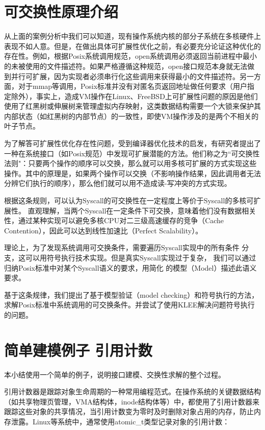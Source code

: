 \section{可交换性原理介绍}

从上面的案例分析中我们可以知道，现有操作系统内核的部分子系统在多核硬件上表现不如人意。但是，在做出具体可扩展性优化之前，有必要充分论证这种优化的存在性。例如，根据Posix系统调用规范，open系统调用必须返回当前进程中最小的未被使用的文件描述符。如果严格遵循这种规范，open接口规范本身就无法做到并行可扩展，因为实现者必须串行化这些调用来获得最小的文件描述符。另一方面，对于mmap等调用，Posix标准并没有对匿名页返回地址做任何要求（用户指定除外），事实上，造成VM操作在Linux、FreeBSD上可扩展性问题的原因是他们使用了红黑树或伸展树来管理虚拟内存映射\cite{radixvm:eurosys13}，这类数据结构需要一个大锁来保护其内部状态（如红黑树的内部节点）的一致性，即使VM操作涉及的是两个不相关的叶子节点。

为了解答可扩展性优化存在性问题，受到编译器优化技术的启发，有研究者提出了一种在系统接口（如Posix规范）中发现可扩展潜能的方法\cite{commuter:2013}。他们称之为``可交换性法则"：只要两个操作的顺序可以交换，那么就可以用多核可扩展的方式实现这些操作。其中的原理是，如果两个操作可以交换（不影响操作结果，因此调用者无法分辨它们执行的顺序），那么他们就可以用不造成读-写冲突的方式实现。

根据这条规则，可以认为Syscall的可交换性在一定程度上等价于Syscall的多核可扩展性。
直观理解，当两个Syscall在一定条件下可交换，意味着他们没有数据相关性，通过某种实现可以避免多核CPU对二三级高速缓存的竞争（Cache
Contention），因此可以达到线性加速比（Perfect Scalability）。

理论上，为了发现系统调用可交换条件，需要遍历Syscall实现中的所有条件
分支，这可以用符号执行技术实现。但是真实Syscall实现过于复杂，
我们可以通过归纳Posix标准中对某个Syscall语义的要求，用简化
的模型（Model）描述此语义要求。

基于这条规律，我们提出了基于模型验证（model
checking）和符号执行的方法，求解Posix标准中系统调用的可交换条件。并尝试了使用KLEE\cite{Cadar:2008:KUA:1855741.1855756}解决问题符号执行的问题。

\section{简单建模例子 \pozhehao 引用计数}
\label{sec:counter}
本小结使用一个简单的例子，说明接口建模、交换性求解的整个过程。

引用计数器是跟踪对象生命周期的一种常用编程范式。在操作系统的关键数据结构（如共享物理页管理，VMA结构体，inode结构体等）中，都使用了引用计数器来跟踪这些对象的共享情况，当引用计数变为零时及时删除对象占用的内存，防止内存泄露。Linux等系统中，通常使用atomic\_t类型记录对象的引用计数：

